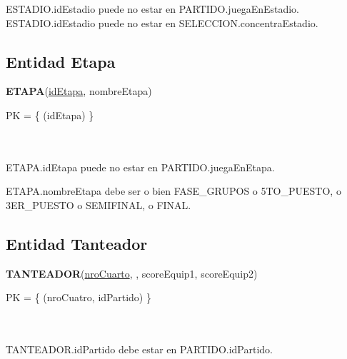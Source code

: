 \documentclass[11pt, a4paper, spanish]{article}
\begin{document}
{{{

ESTADIO.idEstadio puede no estar en PARTIDO.juegaEnEstadio. \\
ESTADIO.idEstadio puede no estar en SELECCION.concentraEstadio. \\



\subsection{Entidad Etapa}

\textbf{ETAPA}(\underline{idEtapa}, nombreEtapa)

PK = \{ (idEtapa) \} \\
 \\
 \\


ETAPA.idEtapa puede no estar en PARTIDO.juegaEnEtapa. \\


ETAPA.nombreEtapa debe ser o bien FASE\_GRUPOS o 5TO\_PUESTO, o 3ER\_PUESTO o SEMIFINAL, o FINAL. 

\subsection{Entidad Tanteador}
\textbf{TANTEADOR}(\underline{nroCuarto}, \underline{}, scoreEquip1, scoreEquip2)

PK = \{ (nroCuatro, idPartido) \} \\
 \\
 \\


TANTEADOR.idPartido debe estar en PARTIDO.idPartido. \\

}}}
\end{document}
